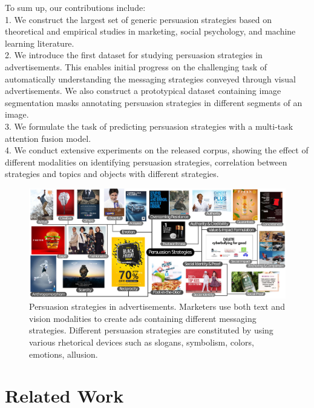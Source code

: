 \documentclass[hidelinks,11pt,a4paper]{report}
\begin{document}
To sum up, our contributions include:\\
1. We construct the largest set of generic persuasion strategies based on theoretical and empirical studies in marketing, social psychology, and machine learning literature. \\
2. We introduce the first dataset for studying persuasion strategies in advertisements. This enables initial progress on the challenging task of automatically understanding the messaging strategies conveyed through visual advertisements. We also construct a prototypical dataset containing image segmentation masks annotating persuasion strategies in different segments of an image.\\
3. We formulate the task of predicting persuasion strategies with a multi-task attention fusion model.\\
4. We conduct extensive experiments on the released corpus,
showing the effect of different modalities on identifying persuasion
strategies, correlation between strategies and topics
and objects with different strategies.\\

\begin{figure}[t]
        \centering
        \includegraphics[width=\textwidth]{images/flowchart.pdf}
        \caption{\small {} Persuasion strategies in advertisements. Marketers use both text and vision modalities to create ads containing different messaging strategies. Different persuasion strategies are constituted by using various rhetorical devices such as slogans, symbolism, colors, emotions, allusion.}
        \label{fig:persuasion-strategies-headline-image}
\end{figure}

\section{Related Work}
\label{sec:related work}
\end{document}

